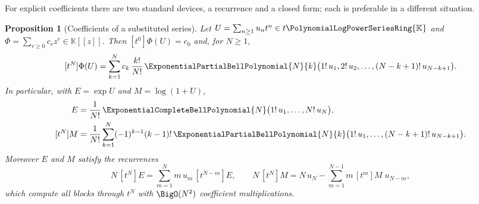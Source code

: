 \documentclass[11pt,oneside]{article}
\theoremstyle{plain}
\newtheorem{proposition}[theorem]{Proposition}
\theoremstyle{definition}
\theoremstyle{remark}
\newcommand{\K}{\mathbb{K}}
\newcommand{\PLpow}{\PolynomialLogPowerSeriesRing{\K}}   %
\begin{document}
For explicit coefficients there are two standard devices, a recurrence and a
closed form; each is preferable in a different situation.

\begin{proposition}[Coefficients of a substituted series]
\label{plt:prop:dif-bell}
Let \(U=\sum_{n\ge1}u_{n}t^{n}\in t\PLpow\) and
\(\Phi=\sum_{r\ge0}c_{r}z^{r}\in\K[[z]]\).  Then \([t^{0}]\Phi(U)=c_{0}\) and,
for \(N\ge1\),
\begin{equation}\label{plt:eq:dif-bell}
  [t^{N}]\Phi(U)
  =\sum_{k=1}^{N}c_{k}\,\frac{k!}{N!}\,
   \ExponentialPartialBellPolynomial{N}{k}
   \bigl(1!\,u_{1},2!\,u_{2},\dots,(N-k+1)!\,u_{N-k+1}\bigr).
\end{equation}
In particular, with \(E=\exp U\) and \(M=\log(1+U)\),
\begin{align}
  [t^{N}]E&=\frac{1}{N!}\,
    \ExponentialCompleteBellPolynomial{N}\bigl(1!\,u_{1},\dots,N!\,u_{N}\bigr),
    \label{plt:eq:dif-exp-bell}\\
  [t^{N}]M&=\frac{1}{N!}\sum_{k=1}^{N}(-1)^{k-1}(k-1)!\,
    \ExponentialPartialBellPolynomial{N}{k}
    \bigl(1!\,u_{1},\dots,(N-k+1)!\,u_{N-k+1}\bigr).
    \label{plt:eq:dif-log-bell}
\end{align}
Moreover \(E\) and \(M\) satisfy the recurrences
\begin{equation}\label{plt:eq:dif-exp-recurrence}
  N\,[t^{N}]E=\sum_{m=1}^{N}m\,u_{m}\,[t^{N-m}]E,
  \qquad
  N\,[t^{N}]M=N\,u_{N}-\sum_{m=1}^{N-1}m\,[t^{m}]M\;u_{N-m},
\end{equation}
which compute all blocks through \(t^{N}\) with \(\BigO(N^{2})\) coefficient
multiplications.
\end{proposition}
\end{document}
